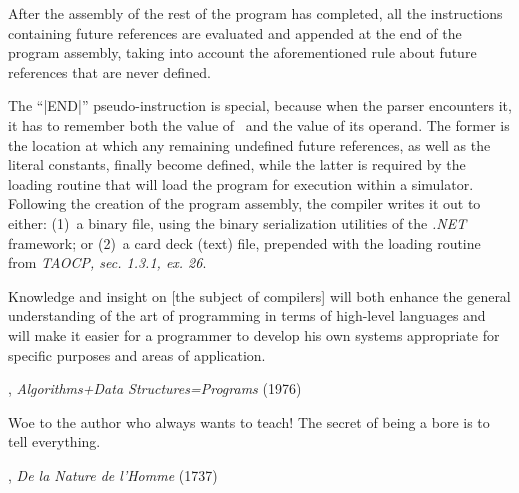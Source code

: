 After the assembly of the rest of the program has completed, all the
instructions containing future references are evaluated and appended at
the end of the program assembly, taking into account the aforementioned
rule about future references that are never defined.

The ``|END|'' pseudo-instruction is special, because when the parser
encounters it, it has to remember both the value of \loccount\ and the value
of its operand. The former is the location at which any remaining
undefined future references, as well as the literal constants, finally
become defined, while the latter is required by the loading routine that
will load the program for execution within a simulator.
\medskip
Following the creation of the program assembly, the compiler writes it
out to either: (1)~a binary file, using the binary serialization utilities
of the {\it .NET} framework; or (2)~a card deck (text) file, prepended
with the loading routine from {\it TAOCP, sec. 1.3.1, ex. 26}.
\endchapter

Knowledge and insight on [the subject of compilers] will both enhance the
general understanding of the art of programming in terms of high-level
languages and will make it easier for a programmer to develop his own
systems appropriate for specific purposes and areas of application.
\author{NIKLAUS WIRTH}, {\sl Algorithms+Data Structures=Programs} (1976)

\bigskip

Woe to the author who always wants to teach!
The secret of being a bore is to tell everything.
\author{VOLTAIRE}, {\sl De la Nature de l'Homme} (1737)
\eject